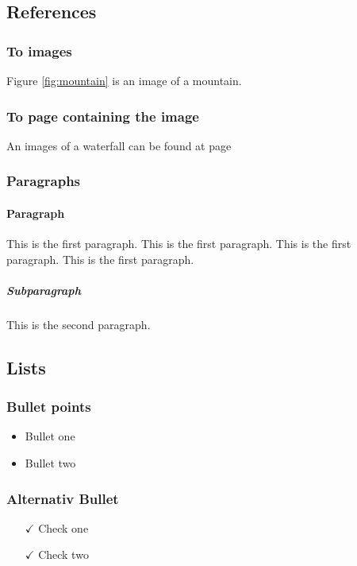 \documentclass{article}
\begin{document}
    \subsection{References}
    \subsubsection*{To images}
    Figure \ref{fig:mountain} is an image of a mountain. 

    \subsubsection*{To page containing the image}
    An images of a waterfall can be found at page \pageref{fig:waterfall}
    
    \subsubsection{Paragraphs}
        \paragraph{Paragraph}
        This is the first paragraph. This is the first paragraph. This is the first paragraph. This is the first paragraph.
        \subparagraph{Subparagraph}
        This is the second paragraph.

    \subsection{Lists}
        \subsubsection{Bullet points}
            \begin{itemize}
                \item Bullet one
                \item Bullet two
            \end{itemize}

        \subsubsection{Alternativ Bullet}
        \begin{itemize}
            \item[$\checkmark$] Check one
            \item[$\checkmark$] Check two
        \end{itemize}
        
\end{document}
